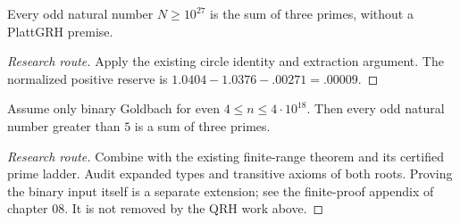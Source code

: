 \begin{theorem}\label{large}\notready
Every odd natural number $N\ge10^{27}$ is the sum of three primes,
without a PlattGRH premise.
\end{theorem}
\begin{proof}[Research route]
Apply the existing circle identity and extraction argument. The normalized
positive reserve is $1.0404-1.0376-.00271=.00009$.
\end{proof}

\begin{theorem}\label{full}\notready
Assume only binary Goldbach for even $4\le n\le4\cdot10^{18}$.
Then every odd natural number greater than $5$ is a sum of three primes.
\end{theorem}
\begin{proof}[Research route]
Combine with the existing finite-range theorem and its certified prime
ladder. Audit expanded types and transitive axioms of both roots. Proving
the binary input itself is a separate extension; see the finite-proof
appendix of chapter 08. It is not removed by the QRH work above.
\end{proof}
